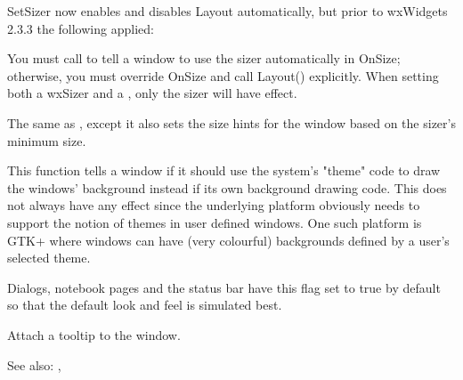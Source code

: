 

SetSizer now enables and disables Layout automatically, but prior to wxWidgets 2.3.3
the following applied:

You must call  to tell a window to use
the sizer automatically in OnSize; otherwise, you must override OnSize and call Layout()
explicitly. When setting both a wxSizer and a ,
only the sizer will have effect.


\label{wxwindowsetsizerandfit}


The same as , except it also sets the size hints
for the window based on the sizer's minimum size.


\label{wxwindowsetthemeenabled}


This function tells a window if it should use the system's "theme" code
to draw the windows' background instead if its own background drawing
code. This does not always have any effect since the underlying platform
obviously needs to support the notion of themes in user defined windows.
One such platform is GTK+ where windows can have (very colourful) backgrounds
defined by a user's selected theme.

Dialogs, notebook pages and the status bar have this flag set to true
by default so that the default look and feel is simulated best.


\label{wxwindowsettooltip}



Attach a tooltip to the window.

See also: ,


\label{wxwindowsetvalidator}

